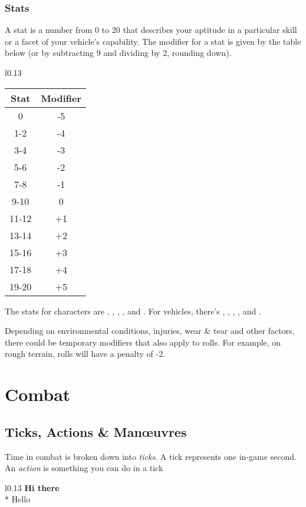 \documentclass[10pt, a4paper, twocolumn]{book}
\begin{document}
\subsection{Stats}
A stat is a number from 0 to 20 that describes your aptitude in a particular
skill or a facet of your vehicle's capability. The modifier for a stat is
given by the table below (or by subtracting 9 and dividing by 2, rounding
down).

\begin{wraptable}{l}{0.13\textwidth}
\vspace*{-10pt}
\begin{tabular}{cc}
  Stat  & Modifier \\
  \hline 
  0     & -5       \\
  1-2   & -4       \\
  3-4   & -3       \\
  5-6   & -2       \\
  7-8   & -1       \\
  9-10  &  0       \\
  11-12 & +1       \\
  13-14 & +2       \\
  15-16 & +3       \\
  17-18 & +4       \\
  19-20 & +5
\end{tabular}
\vspace*{-10pt}
\end{wraptable}

The stats for characters are , , , ,
 and . For vehicles, there's ,
, , ,  and .

Depending on environmental conditions, injuries, wear \&
tear and other factors, there could be temporary modifiers that also apply to
rolls. For example, on rough terrain,  rolls will have a penalty
of -2.

\chapter{Combat}
\section{Ticks, Actions \& Man\oe{}uvres}
Time in combat is broken down into \emph{ticks}. A tick represents one in-game
second. An \emph{action} is something you can do in a tick

\begin{wrapfigure}{l}{0.13\textwidth}
  \textbf{Hi there}\\*
  Hello
\end{wrapfigure}

\lipsum
\end{document}
